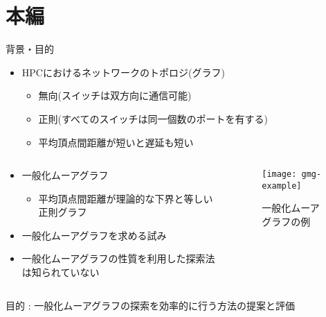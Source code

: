 
\begin{frame}
  \maketitle
\end{frame}

\section{本編}
\begin{frame}{背景・目的}
  \begin{itemize}
  \item HPCにおけるネットワークのトポロジ(グラフ)
    \begin{itemize}
    \item 無向(スイッチは双方向に通信可能)
    \item 正則(すべてのスイッチは同一個数のポートを有する)
    \item 平均頂点間距離が短いと遅延も短い
      \cite{Koibuchi2012,Singla2011}
    \end{itemize}
  \end{itemize}
  \begin{columns}[T]
    \begin{column}{.5\textwidth}
      \begin{itemize}
      \item \alert{一般化ムーアグラフ}
        \begin{itemize}
        \item 平均頂点間距離が理論的な下界と等しい正則グラフ
          \cite{Cerf1973,Cerf1974Lower}
        \end{itemize}
      \item 一般化ムーアグラフを求める試み
        \cite{Yamamoto2016}
      \item 一般化ムーアグラフの性質を利用した探索法は知られていない
      \end{itemize}
    \end{column}
    \begin{column}{.5\textwidth}
      \begin{figure}
        \texttt{[image: gmg-example]}
        \caption{一般化ムーアグラフの例}
      \end{figure}
    \end{column}
  \end{columns}
  \begin{block}{}
    目的 : 一般化ムーアグラフの探索を効率的に行う方法の提案と評価
  \end{block}
\end{frame}

